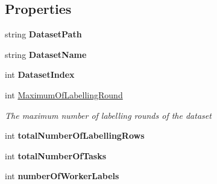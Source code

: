 \subsection*{Properties}
\begin{DoxyCompactItemize}
\item 
\hypertarget{class_acrive_crowd_g_u_i_1_1_dataset_a88eac9f9843ece221b66d6b15f459bb4}{}string {\bfseries Dataset\+Path}\label{class_acrive_crowd_g_u_i_1_1_dataset_a88eac9f9843ece221b66d6b15f459bb4}

\item 
\hypertarget{class_acrive_crowd_g_u_i_1_1_dataset_a3cfd275d7a006364c300bdcf633cd9c0}{}string {\bfseries Dataset\+Name}\label{class_acrive_crowd_g_u_i_1_1_dataset_a3cfd275d7a006364c300bdcf633cd9c0}

\item 
\hypertarget{class_acrive_crowd_g_u_i_1_1_dataset_ad63e089b80a39fa11aba48c19f430c5e}{}int {\bfseries Dataset\+Index}\label{class_acrive_crowd_g_u_i_1_1_dataset_ad63e089b80a39fa11aba48c19f430c5e}

\item 
int \hyperlink{class_acrive_crowd_g_u_i_1_1_dataset_a1ccbc40382a7908c5e7e97761895b321}{Maximum\+Of\+Labelling\+Round}
\begin{DoxyCompactList}\small\item\em The maximum number of labelling rounds of the dataset \end{DoxyCompactList}\item 
\hypertarget{class_acrive_crowd_g_u_i_1_1_dataset_ab9c7103513705f2cab4d0943742137fb}{}int {\bfseries total\+Number\+Of\+Labelling\+Rows}\label{class_acrive_crowd_g_u_i_1_1_dataset_ab9c7103513705f2cab4d0943742137fb}

\item 
\hypertarget{class_acrive_crowd_g_u_i_1_1_dataset_a02b6a052c41e1d6a483d84094be3ab08}{}int {\bfseries total\+Number\+Of\+Tasks}\label{class_acrive_crowd_g_u_i_1_1_dataset_a02b6a052c41e1d6a483d84094be3ab08}

\item 
\hypertarget{class_acrive_crowd_g_u_i_1_1_dataset_a66883a4494d6c978003ca2abfe0ad91a}{}int {\bfseries number\+Of\+Worker\+Labels}\label{class_acrive_crowd_g_u_i_1_1_dataset_a66883a4494d6c978003ca2abfe0ad91a}

\end{DoxyCompactItemize}


